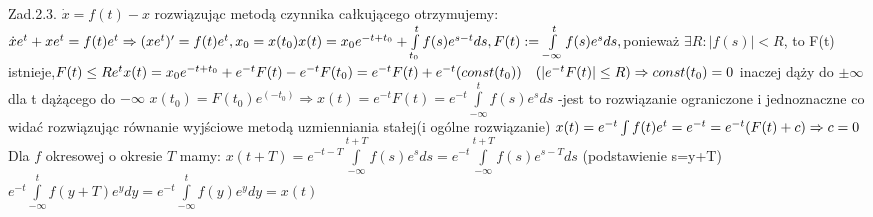 \documentclass{article}
\begin{document}
Zad.2.3.
\newline
\newline
$
\dot{x}=f(t)-x
$
\quad rozwiązując metodą czynnika całkującego otrzymujemy:\newline
$
\dot{x}e^{t}+xe^t=f(t)e^t\Rightarrow (xe^t)'=f(t)e^t,x_0=x(t_0)\newline
x(t)=x_0e^{-t+t_0}+\int\limits_{t_0}^{t}f(s)e^{s-t}ds,F(t):=\int\limits_{-\infty}^{t}f(s)e^sds,$ponieważ $\exists R: |f(s)|<R$, to F(t) istnieje,$F(t)\le Re^t\newline
x(t)=x_0e^{-t+t_0}+e^{-t}F(t)-e^{-t}F(t_0)=e^{-t}F(t)+e^{-t}(const(t_0))\quad (|e^{-t}F(t)|\le R)\Rightarrow const(t_0)=0$
inaczej dąży do $\pm\infty$ dla t dążącego do $-\infty$\newline
$
x(t_0)=F(t_0)e^(-t_0)\Rightarrow x(t)=e^{-t}F(t)=e^{-t}\int\limits_{-\infty}^{t}f(s)e^sds$
-jest to rozwiązanie ograniczone i jednoznaczne co widać rozwiązując równanie wyjściowe metodą uzmienniania stałej(i ogólne rozwiązanie)
$
x(t)=e^{-t}\int\limits f(t)e^t=e^{-t}=e^{-t}(F(t)+c)\Rightarrow c=0\newline
$
Dla $f$ okresowej o okresie $T$ mamy:\newline
$
x(t+T)=e^{-t-T}\int\limits_{-\infty}^{t+T}f(s)e^sds=e^{-t}\int\limits_{-\infty}^{t+T}f(s)e^{s-T}ds$ (podstawienie s=y+T) $
e^{-t}\int\limits_{-\infty}^{t}f(y+T)e^{y}dy=e^{-t}\int\limits_{-\infty}^{t}f(y)e^{y}dy=x(t)
$
\newline
\newline
\end{document}
